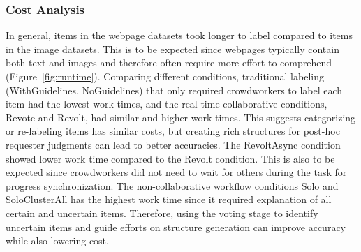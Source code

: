 






\subsubsection{Cost Analysis}


In general, items in the webpage datasets took longer to label compared to items in the image datasets. This is to be expected since webpages typically contain both text and images and therefore often require more effort to comprehend (Figure~\ref{fig:runtime}). 
Comparing different conditions, traditional labeling (WithGuidelines, NoGuidelines) that only required crowdworkers to label each item had the lowest work times, and the real-time collaborative conditions, Revote and Revolt, had similar and higher work times. This suggests categorizing or re-labeling items has similar costs, but creating rich structures for post-hoc requester judgments can lead to better accuracies. The RevoltAsync condition showed lower work time compared to the Revolt condition. This is also to be expected since crowdworkers did not need to wait for others during the task for progress synchronization. The non-collaborative workflow conditions Solo and SoloClusterAll has the highest work time since it required explanation of all certain and uncertain items. Therefore, using the voting stage to identify uncertain items and guide efforts on structure generation can improve accuracy while also lowering cost.

